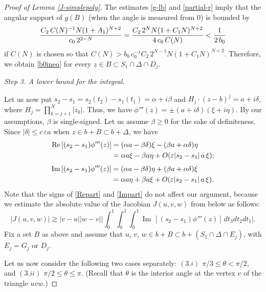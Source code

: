 \documentclass[11 pt]{amsart}
\theoremstyle{plain}
\numberwithin{equation}{section}
\theoremstyle{plain}
\numberwithin{equation}{section}
\theoremstyle{remark}
\begin{document}
\begin{proof}[Proof of Lemma \ref{J-simplepoly}]
The estimates \eqref{g-lb} and \eqref{partial-r} imply that the angular support of $g(B)$ (when the angle is measured from $0$) is bounded by
\begin{align*}
 {C_2\, C(N)^{-1} N (1+A_1)^{N+2}\over c_0 \, 2^{2-N}} = {C_2 \, 2^N N (1+C_1 N)^{N+2}\over 4\, c_0 \, C(N)} < {1\over 2\, b_0} \notag
\end{align*}
if $C(N)$ is chosen so that $C(N) > b_0 \, c_0^{-1} C_2\, 2^{N-1} N (1+C_1 N)^{N+2}$. Therefore, we obtain \eqref{b0ineq} for every $z \in B \subset S_1 \cap \Delta \cap D_j$.
\medskip

\noindent
{\sl Step 3. A lower bound for the integral.}

Let us now put $s_2 - s_1 = s_2(t_2) - s_1 (t_1) = \alpha + i\beta$ and $H_j \cdot (z-b)^j = a + i\delta$, where $H_j = \prod_{k=j+1}^N |z_k|$. Thus, we have $\phi'''(z) = \pm (a + i\delta)(\xi + i\eta)$. By our assumptions, $\beta$ is single-signed.
Let us assume $\beta \ge 0$ for the sake of definiteness.
Since $|\delta| \le c \, {\varepsilon} a$ when $z \in b + B \subset b+\Delta$, we have
\begin{align}\label{Repart}
{\operatorname{Re\,}} [(s_2-s_1)\phi'''(z)] &= (\alpha a - \beta \delta)\xi - (\beta a + \alpha \delta) \eta \\
&= \alpha a \xi - \beta a \eta + O({\varepsilon} |s_2-s_1| \, a \, \xi) ; \notag
\end{align}
\begin{align}\label{Impart}
{\operatorname{Im\,}} [(s_2-s_1)\phi'''(z)] &= (\alpha a - \beta \delta)\eta + (\beta a + \alpha \delta) \xi\\
&= \alpha a \eta + \beta a \xi + O({\varepsilon} |s_2-s_1| \, a \, \xi) . \notag
\end{align}
Note that the signs of \eqref{Repart} and \eqref{Impart}
do not affect our argument, because we estimate the absolute value of the Jacobian $J(u,v,w)$ from below as follows:
\[  |J (u, v, w)| {\gtrsim} |v-u||w-v| \Big|\int_0^1 \int_0^1 \int_0^1 {\operatorname{Im\,}}[(s_2-s_1)\phi'''(z)] \, dt_3 dt_2 dt_1\Big| .
\]
Fix a set $B$ as above and assume that $u$, $v$, $w \in b+ B \subset b+ (S_1 \cap \Delta \cap E_j)$, with $E_j = G_j$ or $D_j$.
\medskip

Let us now consider the following two cases separately:
$(3.i)$ $\pi/3 \le \theta < \pi/2$, and $(3.ii)$ $\pi/2 \le \theta \le \pi$. (Recall that $\theta$ is the interior angle at the vertex $v$ of the triangle $uvw$.)

\medskip


\end{proof}
\end{document}
